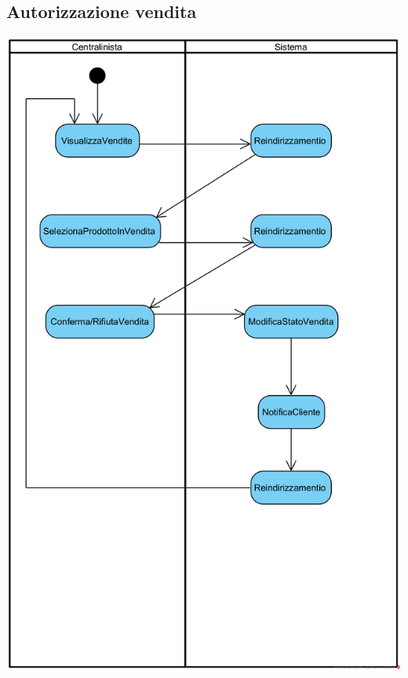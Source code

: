 \documentclass[12pt,a4paper]{article}
\begin{document}
\subsection{Autorizzazione vendita}
\begin{center}
\includegraphics[height=0.95\textheight]{ActivityDiagram/AutorizzazioneVendita}
\end{center}
\end{document}
